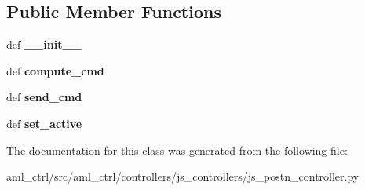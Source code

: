 \subsection*{Public Member Functions}
\begin{DoxyCompactItemize}
\item 
\hypertarget{classaml__ctrl_1_1controllers_1_1js__controllers_1_1js__postn__controller_1_1_j_s_position_controller_ac463a885a8605d9493b750bb479cb6a8}{def {\bfseries \-\_\-\-\_\-init\-\_\-\-\_\-}}\label{classaml__ctrl_1_1controllers_1_1js__controllers_1_1js__postn__controller_1_1_j_s_position_controller_ac463a885a8605d9493b750bb479cb6a8}

\item 
\hypertarget{classaml__ctrl_1_1controllers_1_1js__controllers_1_1js__postn__controller_1_1_j_s_position_controller_a17033e0eba8bfa1c3a2681089feb7bc4}{def {\bfseries compute\-\_\-cmd}}\label{classaml__ctrl_1_1controllers_1_1js__controllers_1_1js__postn__controller_1_1_j_s_position_controller_a17033e0eba8bfa1c3a2681089feb7bc4}

\item 
\hypertarget{classaml__ctrl_1_1controllers_1_1js__controllers_1_1js__postn__controller_1_1_j_s_position_controller_adff2d8a101823f2830097b24c097d01a}{def {\bfseries send\-\_\-cmd}}\label{classaml__ctrl_1_1controllers_1_1js__controllers_1_1js__postn__controller_1_1_j_s_position_controller_adff2d8a101823f2830097b24c097d01a}

\item 
\hypertarget{classaml__ctrl_1_1controllers_1_1js__controllers_1_1js__postn__controller_1_1_j_s_position_controller_a4748c9f80fbbc3b24326e295d0755482}{def {\bfseries set\-\_\-active}}\label{classaml__ctrl_1_1controllers_1_1js__controllers_1_1js__postn__controller_1_1_j_s_position_controller_a4748c9f80fbbc3b24326e295d0755482}

\end{DoxyCompactItemize}


The documentation for this class was generated from the following file\-:\begin{DoxyCompactItemize}
\item 
aml\-\_\-ctrl/src/aml\-\_\-ctrl/controllers/js\-\_\-controllers/js\-\_\-postn\-\_\-controller.\-py\end{DoxyCompactItemize}
